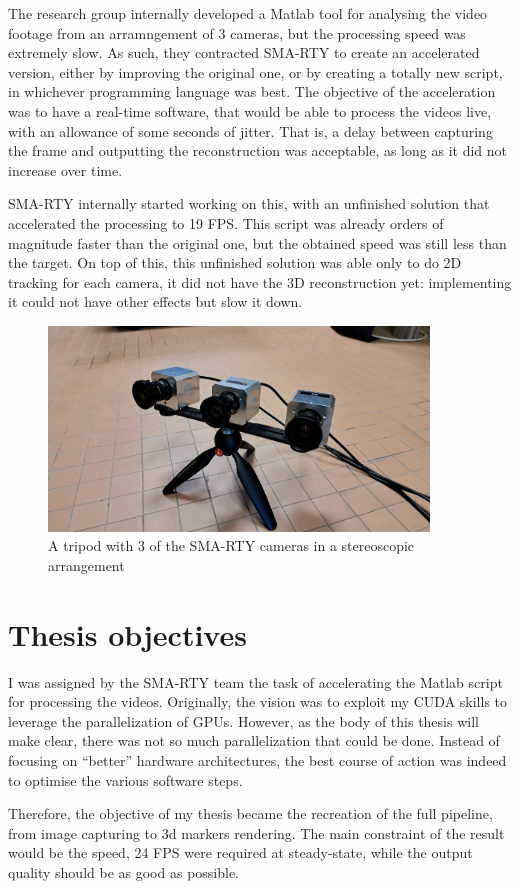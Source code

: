 The research group internally developed a Matlab tool for analysing the video footage from an arramngement of 3 cameras, but the processing speed was extremely slow.
As such, they contracted SMA-RTY to create an accelerated version, either by improving the original one, or by creating a totally new script, in whichever programming language was best.
The objective of the acceleration was to have a real-time software, that would be able to process the videos live, with an allowance of some seconds of jitter.
That is, a delay between capturing the frame and outputting the reconstruction was acceptable, as long as it did not increase over time.

SMA-RTY internally started working on this, with an unfinished solution that accelerated the processing to 19 FPS.
This script was already orders of magnitude faster than the original one, but the obtained speed was still less than the target.
On top of this, this unfinished solution was able only to do 2D tracking for each camera, it did not have the 3D reconstruction yet: implementing  it could not have other effects but slow it down.

\begin{figure}
	\centerline{\includegraphics[width=0.9\textwidth]{images/cameras.jpg}}
	\caption{\centering A tripod with 3 of the SMA-RTY cameras in a stereoscopic arrangement}
	\label{fig:camera-setup}
\end{figure}

\section{Thesis objectives}

I was assigned by the SMA-RTY team the task of accelerating the Matlab script for processing the videos.
Originally, the vision was to exploit my CUDA skills to leverage the parallelization of GPUs.
However, as the body of this thesis will make clear, there was not so much parallelization that could be done.
Instead of focusing on ``better'' hardware architectures, the best course of action was indeed to optimise the various software steps.

Therefore, the objective of my thesis became the recreation of the full pipeline, from image capturing to 3d markers rendering.
The main constraint of the result would be the speed, 24 FPS were required at steady-state, while the output quality should be as good as possible.
